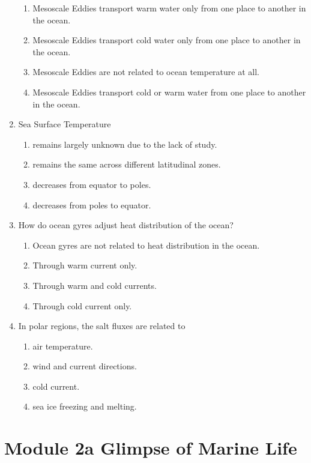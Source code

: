 \documentclass{report}
\begin{document}
\begin{enumerate}
    \begin{enumerate}
        \item   Mesoscale Eddies transport warm water only from one place to another in the ocean.
        \item   Mesoscale Eddies transport cold water only from one place to another in the ocean. 
        \item   Mesoscale Eddies are not related to ocean temperature at all. 
        \item   Mesoscale Eddies transport cold or warm water from one place to another in the ocean.
    \end{enumerate}
    \item Sea Surface Temperature
    \begin{enumerate}
        \item   remains largely unknown due to the lack of study. 
        \item   remains the same across different latitudinal zones. 
        \item   decreases from equator to poles. 
        \item   decreases from poles to equator. 
    \end{enumerate}
    \item How do ocean gyres adjust heat distribution of the ocean?
    \begin{enumerate}
        \item   Ocean gyres are not related to heat distribution in the ocean. 
        \item   Through warm current only. 
        \item   Through warm and cold currents. 
        \item   Through cold current only. 
    \end{enumerate}
    \item In polar regions, the salt fluxes are related to
    \begin{enumerate}
        \item   air temperature. 
        \item   wind and current directions. 
        \item   cold current. 
        \item   sea ice freezing and melting. 
    \end{enumerate}
\end{enumerate}


\chapter{Module 2a Glimpse of Marine Life}
\end{document}

